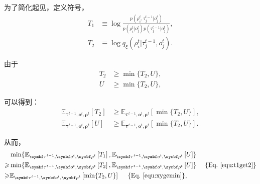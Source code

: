 为了简化起见，定义符号，
\begin{equation}
    \begin{aligned}
    T_1 &\equiv \log\frac{p(\rho^{t}_i, \tau^{t-1}_j | o^t_j)}{p(\rho^{t}_i | o^t_j)p(\tau^{t-1}_j | o^t_j)},\\
    T_2 &\equiv \log q_\xi(\rho^{t}_i| \tau^{t-1}_j, o^t_j).
    \end{aligned}
\end{equation}

由于
\begin{equation}
    \begin{aligned}
    T_2 &\ge \min\{T_2, U\}, \\
    U &\ge \min\{T_2, U\},
    \end{aligned}
\end{equation}

可以得到：
\begin{equation}
    \begin{aligned}
    \mathbb{E}_{\bm{\tau}^{t-1}, \bm{o}^t, \bm{\rho}^t}\left[T_2\right] &\ge \mathbb{E}_{\bm{\tau}^{t-1}, \bm{o}^t, \bm{\rho}^t}\left[\min\{T_2, U\}\right], \\
    \mathbb{E}_{\bm{\tau}^{t-1}, \bm{o}^t, \bm{\rho}^t}\left[U\right] &\ge \mathbb{E}_{\bm{\tau}^{t-1}, \bm{o}^t, \bm{\rho}^t}\left[\min\{T_2, U\}\right].\label{equ:xygemin}
    \end{aligned}
\end{equation}

从而，
\begin{equation}
    \begin{aligned}
     &\min\{\mathbb{E}_{\bm{\tau}^{t-1}, \bm{o}^t, \bm{\rho}^t}\left[T_1\right], \mathbb{E}_{\bm{\tau}^{t-1}, \bm{o}^t, \bm{\rho}^t}\left[U\right]\} \\
     \ge &\min\{\mathbb{E}_{\bm{\tau}^{t-1}, \bm{o}^t, \bm{\rho}^t}\left[T_2\right], \mathbb{E}_{\bm{\tau}^{t-1}, \bm{o}^t, \bm{\rho}^t}\left[U\right]\} \ \ \ \ \{\text{Eq.~\ref{equ:t1get2}}\} \\
     \ge & \mathbb{E}_{\bm{\tau}^{t-1}, \bm{o}^t, \bm{\rho}^t}\left[\min\{T_2, U\}\right] \ \ \ \ \{\text{Eq.~\ref{equ:xygemin}}\}, \label{equ:minexpectation}
    \end{aligned}
\end{equation}

